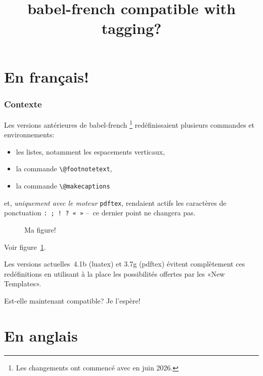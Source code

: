 \documentclass[british,french]{article}
\title{babel-french compatible with tagging?} %
\begin{document}
\tableofcontents

\clearpage

\part{En français!}

\section{Contexte}

Les versions antérieures de babel-french%
\footnote{Les changements ont commencé avec en juin 2026.}
redéfinissaient plusieurs commandes et environnements:
\begin{itemize}
\item les listes, notamment les espacements verticaux,
\item la commande \verb+\@footnotetext+,
\item la commande \verb+\@makecaptions+
\end{itemize}
et, \emph{uniquement avec le moteur} \texttt{pdftex}, rendaient actifs les
caractères de ponctuation \texttt{: ; ! ? « »} --~ce dernier point ne changera
pas.

\begin{figure}[hb]
  \begin{center}
    \caption{Ma figure!}
    \label{fig-xx}
  \end{center}
\end{figure}

Voir figure~\ref{fig-xx}.

Les versions actuelles~4.1b (luatex) et 3.7g (pdftex) évitent complètement
ces redéfinitions en utilisant à la place les possibilités offertes par les
«New Templates».

Est-elle maintenant compatible? Je l’espère!

\clearpage
\part{En anglais}
\end{document}

